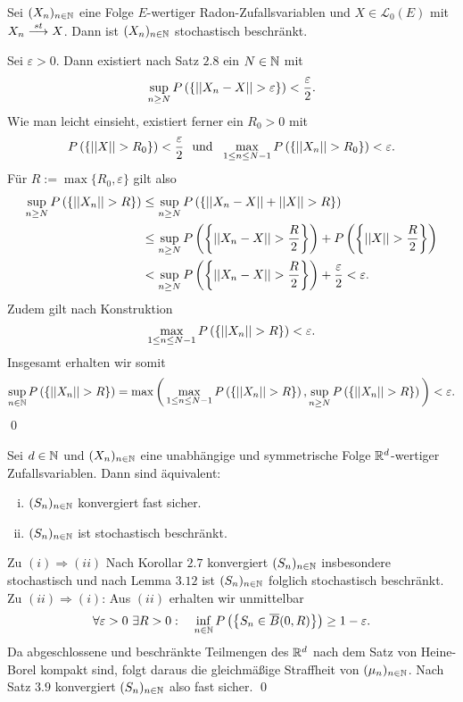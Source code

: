 \begin{lemma}
    Sei $(X_n)_{n \in \mathbb{N}}$ eine Folge $E$-wertiger Radon-Zufallsvariablen und $X \in \mathcal{L}_0(E)$ mit $X_n \overset{st}{\longrightarrow} X$. Dann ist $(X_n)_{n \in \mathbb{N}}$ stochastisch beschränkt. 
\end{lemma}
\begin{proof*}
    Sei $\varepsilon > 0$. Dann existiert nach Satz $2.8$ ein $N \in \mathbb{N}$ mit 
    $$
        \sup_{n \geq N}P\left(\left\{ \lvert\lvert X_n - X \rvert\rvert > \varepsilon \right\}\right) < \frac{\varepsilon}{2}.
    $$
    Wie man leicht einsieht, existiert ferner ein $R_0 > 0$ mit 
    $$
        P\left(\left\{  \lvert\lvert X \rvert\rvert > R_0 \right\}\right) < \frac{\varepsilon}{2} \ \text{ und } \ \max_{1 \leq n \leq N-1}P\left(\left\{ \lvert\lvert X_n \rvert\rvert > R_0 \right\}\right) < \varepsilon.
    $$
    Für $R := \max\{R_0, \varepsilon\}$ gilt also 
    \begin{align*}
        \sup_{n \geq N}P\left(\left\{ \lvert\lvert X_n \rvert\rvert > R \right\}\right) &\leq \sup_{n \geq N}P\left(\left\{ \lvert\lvert X_n - X \rvert\rvert + \lvert\lvert X \rvert\rvert > R \right\}\right) \\\
                                            &\leq \sup_{n \geq N}P\left(\left\{ \lvert\lvert X_n - X \rvert\rvert > \frac{R}{2} \right\}\right) + P\left(\left\{ \lvert\lvert X \rvert\rvert > \frac{R}{2} \right\}\right) \\\
                                            &< \sup_{n \geq N}P\left(\left\{ \lvert\lvert X_n - X \rvert\rvert > \frac{R}{2} \right\}\right) + \frac{\varepsilon}{2} < \varepsilon. 
    \end{align*}
    Zudem gilt nach Konstruktion
    $$
        \max_{1\leq n \leq N-1}P\left(\left\{ \lvert\lvert X_n \rvert\rvert > R \right\}\right) < \varepsilon. 
    $$
    Insgesamt erhalten wir somit 
    $$
        \sup_{n \in \mathbb{N}} P\left(\left\{ \lvert\lvert X_n \rvert\rvert>R \right\}\right)= \max\bigg(\max_{1\leq n \leq N-1}P\left(\left\{ \lvert\lvert X_n \rvert\rvert > R \right\}\right),\sup_{n \geq N}P\left(\left\{ \lvert\lvert X_n \rvert\rvert> R \right\}\right)\bigg) < \varepsilon. 
    $$
    \qed 
\end{proof*}
\begin{corollary}
    Sei $d \in \mathbb{N}$ und $(X_n)_{n \in \mathbb{N}}$ eine unabhängige und symmetrische Folge $\mathbb{R}^d$-wertiger Zufallsvariablen. Dann sind äquivalent: 
    \begin{enumerate}[(i)]
        \item $(S_n)_{n \in \mathbb{N}}$ konvergiert fast sicher. 
        \item $(S_n)_{n \in \mathbb{N}}$ ist stochastisch beschränkt. 
    \end{enumerate} 
\end{corollary}
\begin{proof*}
    Zu $(i) \Rightarrow (ii)$ Nach Korollar $2.7$ konvergiert $(S_n)_{n \in \mathbb{N}}$ insbesondere stochastisch und nach Lemma $3.12$ ist $(S_n)_{n \in \mathbb{N}}$ folglich stochastisch beschränkt.   
    \newline Zu $(ii) \Rightarrow (i)$: Aus $(ii)$ erhalten wir unmittelbar
    $$
        \forall \varepsilon > 0 \ \exists R > 0: \quad \inf_{n \in \mathbb{N}}P\left(\left\{ S_n \in \overline{B}(0,R) \right\}\right) \geq 1 - \varepsilon.
    $$
    Da abgeschlossene und beschränkte Teilmengen des $\mathbb{R}^d$ nach dem Satz von Heine-Borel kompakt sind, folgt daraus die gleichmäßige Straffheit von $(\mu_n)_{n \in \mathbb{N}}$. 
    Nach Satz $3.9$ konvergiert $(S_n)_{n \in \mathbb{N}}$ also fast sicher. \qed 
\end{proof*}



